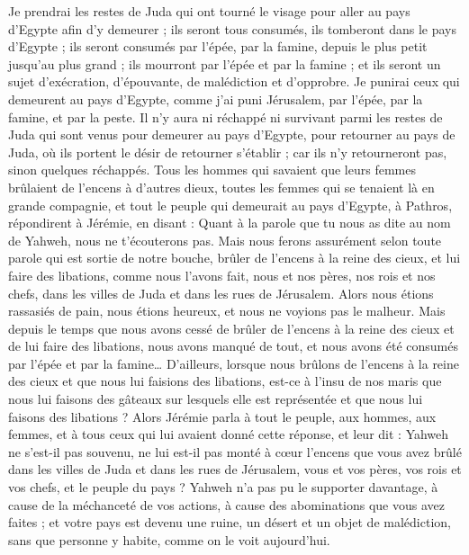 \begin{multicols}{2}
Je prendrai les restes de Juda qui ont tourné le visage pour aller au pays d'Egypte afin d’y demeurer ; ils seront tous consumés, ils tomberont dans le pays d'Egypte ; ils seront consumés par l'épée, par la famine, depuis le plus petit jusqu’au plus grand ; ils mourront par l'épée et par la famine ; et ils seront un sujet d’exécration, d’épouvante, de malédiction et d’opprobre.
Je punirai ceux qui demeurent au pays d'Egypte, comme j'ai puni Jérusalem, par l'épée, par la famine, et par la peste.
Il n'y aura ni réchappé ni survivant parmi les restes de Juda qui sont venus pour demeurer au pays d'Egypte, pour retourner au pays de Juda, où ils portent le désir de retourner s’établir ; car ils n’y retourneront pas, sinon quelques réchappés.
Tous les hommes qui savaient que leurs femmes brûlaient de l’encens à d'autres dieux, toutes les femmes qui se tenaient là en grande compagnie, et tout le peuple qui demeurait au pays d'Egypte, à Pathros, répondirent à Jérémie, en disant :
Quant à la parole que tu nous as dite au nom de Yahweh, nous ne t'écouterons pas.
Mais nous ferons assurément selon toute parole qui est sortie de notre bouche, brûler de l’encens à la reine des cieux, et lui faire des libations, comme nous l’avons fait, nous et nos pères, nos rois et nos chefs, dans les villes de Juda et dans les rues de Jérusalem. Alors nous étions rassasiés de pain, nous étions heureux, et nous ne voyions pas le malheur.
Mais depuis le temps que nous avons cessé de brûler de l’encens à la reine des cieux et de lui faire des libations, nous avons manqué de tout, et nous avons été consumés par l'épée et par la famine…
D’ailleurs, lorsque nous brûlons de l’encens à la reine des cieux et que nous lui faisions des libations, est-ce à l'insu de nos maris que nous lui faisons des gâteaux sur lesquels elle est représentée et que nous lui faisons des libations ?
Alors Jérémie parla à tout le peuple, aux hommes, aux femmes, et à tous ceux qui lui avaient donné cette réponse, et leur dit :
Yahweh ne s'est-il pas souvenu, ne lui est-il pas monté à cœur l’encens que vous avez brûlé dans les villes de Juda et dans les rues de Jérusalem, vous et vos pères, vos rois et vos chefs, et le peuple du pays ?
Yahweh n'a pas pu le supporter davantage, à cause de la méchanceté de vos actions, à cause des abominations que vous avez faites ; et votre pays est devenu une ruine, un désert et un objet de malédiction, sans que personne y habite, comme on le voit aujourd'hui.

\end{multicols}
